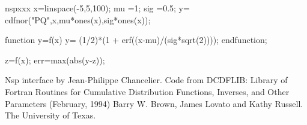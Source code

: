 \begin{mintednsp}{nspxxx}
x=linspace(-5,5,100);
mu =1;
sig =0.5;
y= cdfnor("PQ",x,mu*ones(x),sig*ones(x));

function y=f(x)
  y= (1/2)*(1 + erf((x-mu)/(sig*sqrt(2))));
endfunction;

z=f(x);
err=max(abs(y-z));
\end{mintednsp}

\begin{authors}
  Nsp interface by Jean-Philippe Chancelier. Code from DCDFLIB: 
  Library of Fortran Routines for Cumulative Distribution
  Functions, Inverses, and Other Parameters (February, 1994)
  Barry W. Brown, James Lovato and Kathy Russell. The University of Texas.
\end{authors}

